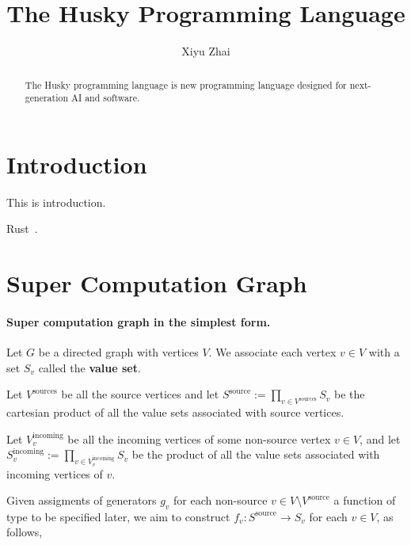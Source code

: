\documentclass{article}
\title{The Husky Programming Language}
\date{}
\author{Xiyu Zhai}
\begin{document}

\maketitle

\begin{abstract}
	The Husky programming language is new programming language designed for next-generation AI and software.
\end{abstract}





\section{Introduction}
This is introduction.

Rust~\cite{bugden2022rust}.

\section{Super Computation Graph}

\paragraph{Super computation graph in the simplest form.} Let $G$ be a directed graph with vertices $V$. We associate each vertex $v\in V$ with a set $S_v$ called the \textbf{value set}.

Let $V^{\text{sources}}$ be all the source vertices and let $S^{\text{source}}:=\prod_{v\in V^{\text{sources}}}S_v$ be the cartesian product of all the value sets associated with source vertices.

Let $V^{\text{incoming}}_v$ be all the incoming vertices of some non-source vertex $v\in V$, and let $S^{\text{incoming}}_v:=\prod_{v\in V^{\text{incoming}}_v}S_v$ be the product of all the value sets associated with incoming vertices of $v$.

Given assigments of generators $g_v$ for each non-source $v\in V\setminus V^{\text{source}}$ a function of type to be specified later, we aim to construct $f_v: S^{\text{source}} \rightarrow S_v$ for each $v\in V$, as follows,
\end{document}
